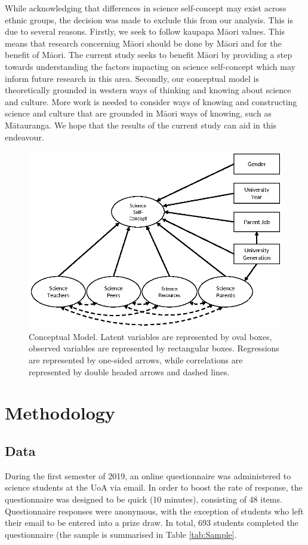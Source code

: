While acknowledging that differences in science self-concept may exist across ethnic groups, the decision was made to exclude this from our analysis. This is due to several reasons. Firstly, we seek to follow kaupapa M\={a}ori values. This means that research concerning M\={a}ori should be done by M\={a}ori and for the benefit of M\={a}ori. \cite{walker2006exploration} The current study seeks to benefit M\={a}ori by providing a step towards understanding the factors impacting on science self-concept which may inform future research in this area. Secondly, our conceptual model is theoretically grounded in western ways of thinking and knowing about science and culture. More work is needed to consider ways of knowing and constructing science and culture that are grounded in M\={a}ori ways of knowing, such as M\={a}tauranga. \cite{hikuroa2017matauranga} We hope that the results of the current study can aid in this endeavour. 
\begin{figure}
 \includegraphics{ConceptualModel.eps}
\caption{Conceptual Model. Latent variables are represented by oval boxes, observed variables are represented by rectangular boxes. Regressions are represented by one-sided arrows, while correlations are represented by double headed arrows and dashed lines. }
\label{fig:1}       
\end{figure}

\section*{Methodology}
\label{method}
\subsection*{Data}
\label{data}
During the first semester of 2019, an online questionnaire was administered to science students at the UoA via email. In order to boost the rate of response, the questionnaire was designed to be quick (10 minutes), consisting of 48 items. Questionnaire responses were anonymous, with the exception of students who left their email to be entered into a prize draw. In total, 693 students completed the questionnaire (the sample is summarised in Table \ref{tab:Sample}. 


